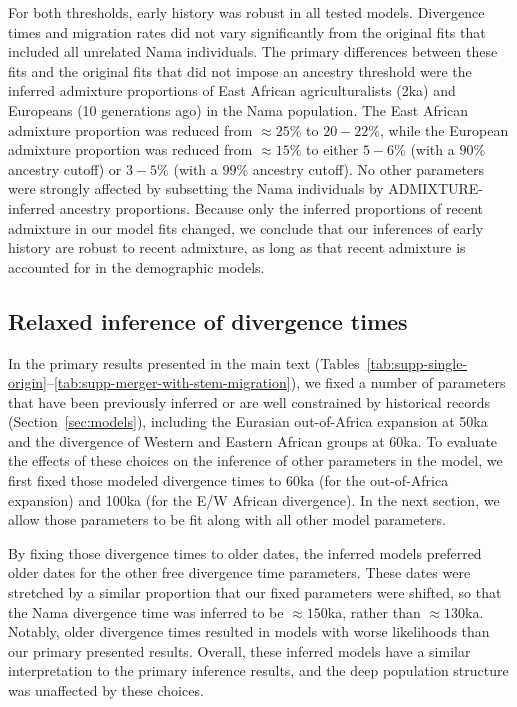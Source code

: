 \documentclass[]{article}
\begin{document}
For both thresholds, early history was robust in all tested models. Divergence
times and migration rates did not vary significantly from the original fits
that included all unrelated Nama individuals. The primary differences between
these fits and the original fits that did not impose an ancestry threshold were
the inferred admixture proportions of East African agriculturalists (2ka) and
Europeans (10 generations ago) in the Nama population. The East African
admixture proportion was reduced from $\approx 25\%$ to $20-22\%$, while the
European admixture proportion was reduced from $\approx 15\%$ to either $5-6\%$
(with a $90\%$ ancestry cutoff) or $3-5\%$ (with a $99\%$ ancestry cutoff). No
other parameters were strongly affected by subsetting the Nama individuals by
ADMIXTURE-inferred ancestry proportions. Because only the inferred proportions
of recent admixture in our model fits changed, we conclude that our inferences
of early history are robust to recent admixture, as long as that recent
admixture is accounted for in the demographic models.

\subsection{Relaxed inference of divergence times}
\label{sec:change-dates}

In the primary results presented in the main text
(Tables~\ref{tab:supp-single-origin}--\ref{tab:supp-merger-with-stem-migration}),
we fixed a number of parameters that have been previously inferred or are well
constrained by historical records (Section~\ref{sec:models}), including the
Eurasian out-of-Africa expansion at 50ka and the divergence of Western and
Eastern African groups at 60ka. To evaluate the effects of these choices on the
inference of other parameters in the model, we first fixed those modeled
divergence times to 60ka (for the out-of-Africa expansion) and 100ka (for the
E/W African divergence). In the next section, we allow those parameters to be
fit along with all other model parameters.

By fixing those divergence times to older dates, the inferred models preferred
older dates for the other free divergence time parameters. These dates were
stretched by a similar proportion that our fixed parameters were shifted, so
that the Nama divergence time was inferred to be $\approx150$ka, rather than
$\approx130$ka. Notably, older divergence times resulted in models with worse
likelihoods than our primary presented results. Overall, these inferred models
have a similar interpretation to the primary inference results, and the deep
population structure was unaffected by these choices.
\end{document}
